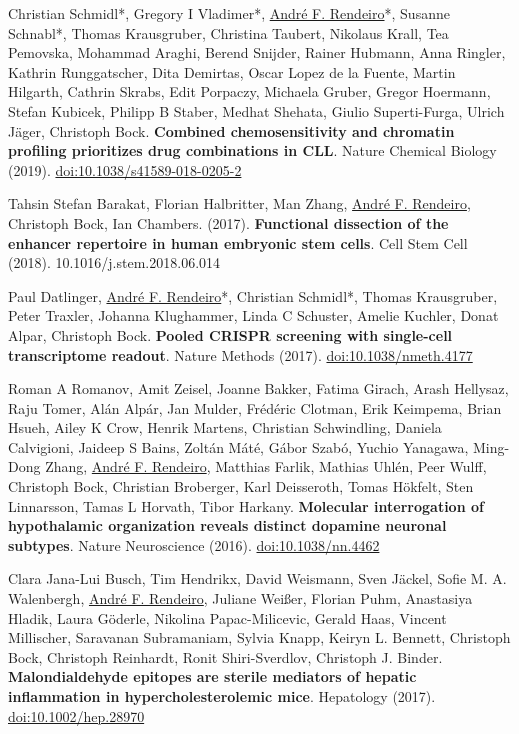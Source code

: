 \documentclass[11pt,a4paper,roman]{moderncv} %
\begin{document}
\begin{etaremune}[leftmargin=1.0cm, itemindent=0pt, topsep=10pt, itemsep=2pt, partopsep=0pt, parsep=0pt]
        \item Christian Schmidl*, Gregory I Vladimer*, \underline{André F. Rendeiro}*, Susanne Schnabl*, Thomas Krausgruber, Christina Taubert, Nikolaus Krall, Tea Pemovska, Mohammad Araghi, Berend Snijder, Rainer Hubmann, Anna Ringler, Kathrin Runggatscher, Dita Demirtas, Oscar Lopez de la Fuente, Martin Hilgarth, Cathrin Skrabs, Edit Porpaczy, Michaela Gruber, Gregor Hoermann, Stefan Kubicek, Philipp B Staber, Medhat Shehata, Giulio Superti-Furga, Ulrich Jäger, Christoph Bock. \textbf{Combined chemosensitivity and chromatin profiling prioritizes drug combinations in CLL}. Nature Chemical Biology (2019).
        \href{https://dx.doi.org/10.1038/s41589-018-0205-2}{doi:10.1038/s41589-018-0205-2}

        \item Tahsin Stefan Barakat, Florian Halbritter, Man Zhang, \underline{André F. Rendeiro}, Christoph Bock, Ian Chambers. (2017). \textbf{Functional dissection of the enhancer repertoire in human embryonic stem cells}. Cell Stem Cell (2018). 10.1016/j.stem.2018.06.014
        \item Paul Datlinger, \underline{André F. Rendeiro}*, Christian Schmidl*, Thomas Krausgruber, Peter Traxler, Johanna Klughammer, Linda C Schuster, Amelie Kuchler, Donat Alpar, Christoph Bock. \textbf{Pooled CRISPR screening with single-cell transcriptome readout}. Nature Methods (2017).
        \href{https://dx.doi.org/10.1038/nmeth.4177}{doi:10.1038/nmeth.4177}

        \item Roman A Romanov, Amit Zeisel, Joanne Bakker, Fatima Girach, Arash Hellysaz, Raju Tomer, Alán Alpár, Jan Mulder, Frédéric Clotman, Erik Keimpema, Brian Hsueh, Ailey K Crow, Henrik Martens, Christian Schwindling, Daniela Calvigioni, Jaideep S Bains, Zoltán Máté, Gábor Szabó, Yuchio Yanagawa, Ming-Dong Zhang, \underline{André F. Rendeiro}, Matthias Farlik, Mathias Uhlén, Peer Wulff, Christoph Bock, Christian Broberger, Karl Deisseroth, Tomas Hökfelt, Sten Linnarsson, Tamas L Horvath, Tibor Harkany. \textbf{Molecular interrogation of hypothalamic organization reveals distinct dopamine neuronal subtypes}. Nature Neuroscience (2016).
        \href{https://dx.doi.org/10.1038/nn.4462}{doi:10.1038/nn.4462}

        \item Clara Jana-Lui Busch, Tim Hendrikx, David Weismann, Sven Jäckel, Sofie M. A. Walenbergh, \underline{André F. Rendeiro}, Juliane Weißer, Florian Puhm, Anastasiya Hladik, Laura Göderle, Nikolina Papac-Milicevic, Gerald Haas, Vincent Millischer, Saravanan Subramaniam, Sylvia Knapp, Keiryn L. Bennett, Christoph Bock, Christoph Reinhardt, Ronit Shiri-Sverdlov, Christoph J. Binder. \textbf{Malondialdehyde epitopes are sterile mediators of hepatic inflammation in hypercholesterolemic mice}. Hepatology (2017).
        \href{https://dx.doi.org/10.1002/hep.28970}{doi:10.1002/hep.28970}


\end{etaremune}
\end{document}
